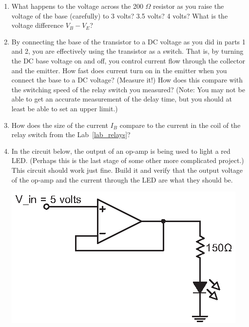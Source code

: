 \begin{enumerate}[wide]
\item What happens to the voltage across the 200 $\Omega$ resistor as you raise the voltage of the base (carefully) to 3 volts?  3.5 volts?  4 volts?  What is the voltage difference $V_B-V_E$?

\item By connecting the base of the transistor to a DC voltage as you did in parts 1 and 2, you are effectively using the transistor as a switch.  That is, by turning the DC base voltage on and off, you control current flow through the collector and the emitter.  How fast does current turn on in the emitter when you connect the base to a DC voltage?  (Measure it!)  How does this compare with the switching speed of the relay switch you measured?  (Note: You may not be able to get an accurate measurement of the delay time, but you should at least be able to set an upper limit.)

\item How does the size of the current $I_B$ compare to the current in the coil of the relay switch from the Lab~\ref{lab_relays}?

\item In the circuit below, the output of an op-amp is being used to light a red LED.  (Perhaps this is the last stage of some other more complicated project.)  This circuit should work just fine. Build it and verify that the output voltage of the op-amp and the current through the LED are what they should be. 
\begin{center}
\includegraphics{bjt/buffer_one_led.eps}
\end{center}


\end{enumerate}
